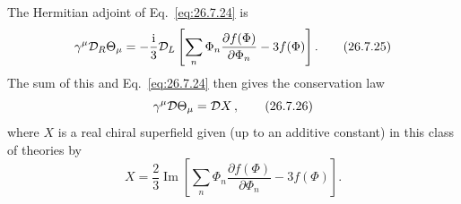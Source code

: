 The Hermitian adjoint of Eq.~\eqref{eq:26.7.24} is
\begin{equation}
  \gamma^\mu\mathcal{D}_R\Theta_\mu
  =-\frac{\mathrm{i}}{3}\mathcal{D}_L
    \left[
      \sum_n\Phi_n\frac{\partial f(\Phi)}{\partial\Phi_n}
      -3f(\Phi)
    \right].
  \tag{26.7.25}\label{eq:26.7.25}
\end{equation}
The sum of this and Eq.~\eqref{eq:26.7.24} then gives the conservation law
\begin{equation}
  \gamma^\mu\mathcal{D}\Theta_\mu=\mathcal{D} X\,,
  \tag{26.7.26}\label{eq:26.7.26}
\end{equation}
where \(X\) is a real chiral superfield given (up to an additive constant)
in this class of theories by
\begin{equation}
  X=\frac{2}{3}\operatorname{Im}
  \left[
    \sum_n\Phi_n\frac{\partial f(\Phi)}{\partial\Phi_n}
    -3f(\Phi)
  \right].
  \tag{26.7.27}\label{eq:26.7.27}
\end{equation}


